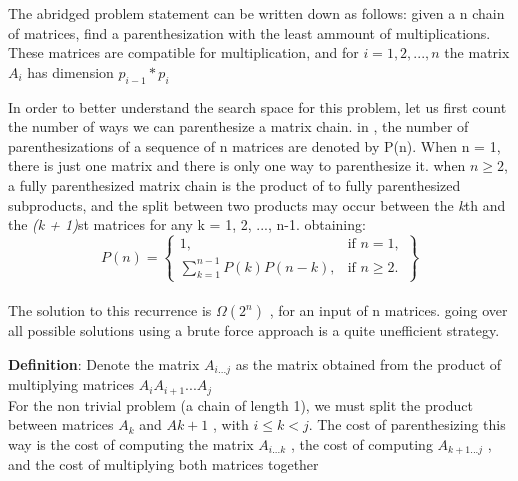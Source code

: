 The abridged problem statement can be written down as follows: given a n chain of matrices,
find a parenthesization with the least ammount of multiplications. These matrices are compatible
for multiplication, and for $i = 1, 2, ..., n$ the matrix $A_i$ has dimension $p_{i-1} * p_i$


In order to better understand the search space for this problem, let us first count the number
of ways we can parenthesize a matrix chain. in \cite{cormen2009introduction}, the number of
parenthesizations of a sequence of n matrices are denoted by P(n). When n = 1, there is just one matrix and there is only
one way to parenthesize it. when $n \geq 2$, a fully parenthesized matrix chain is the product of to 
fully parenthesized subproducts, and the split between two products may occur between the \emph{k}th and the
\emph{(k + 1)}st matrices for any k = 1, 2, ..., n-1. obtaining:
  \\
  \[
    P(n) = \left\{\begin{array}{lr}
      1, & \text{if } n = 1,\\
      \sum_{k=1}^{n-1}P(k)P(n-k), & \text{if } n \geq 2.
      \end{array}\right\}
  \]
  \\


The solution to this recurrence is $\Omega (2^n)$ \cite{cormen2009introduction}, for an input of n matrices.
going over all possible solutions using a brute force approach is a quite unefficient strategy.


\textbf{Definition}: Denote the matrix $A_{i...j}$ as the matrix obtained from the product of
multiplying matrices $A_i A_{i+1} ...A_j$
\\

For the non trivial problem (a chain of length 1), we must split the product between matrices
$A_k$ and $A {k+1}$ , with $i \leq k < j$. The cost of parenthesizing this way is the
cost of computing the matrix $A_{i...k}$ , the cost of computing $A_{k+1...j}$ , and
the cost of multiplying both matrices together
\\

\\


